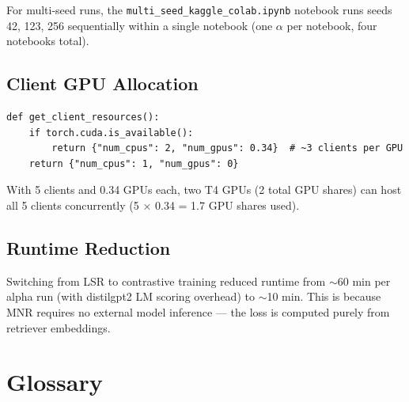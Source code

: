\documentclass[12pt,a4paper]{article}
\begin{document}
For multi-seed runs, the \texttt{multi\_seed\_kaggle\_colab.ipynb} notebook runs seeds 42, 123, 256 sequentially within a single notebook (one $\alpha$ per notebook, four notebooks total).

\subsection{Client GPU Allocation}

\begin{lstlisting}[caption={GPU allocation per Flower client}]
def get_client_resources():
    if torch.cuda.is_available():
        return {"num_cpus": 2, "num_gpus": 0.34}  # ~3 clients per GPU
    return {"num_cpus": 1, "num_gpus": 0}
\end{lstlisting}

With 5 clients and 0.34 GPUs each, two T4 GPUs (2 total GPU shares) can host all 5 clients concurrently (5 $\times$ 0.34 = 1.7 GPU shares used).

\subsection{Runtime Reduction}

Switching from LSR to contrastive training reduced runtime from $\sim$60 min per alpha run (with distilgpt2 LM scoring overhead) to $\sim$10 min. This is because MNR requires no external model inference --- the loss is computed purely from retriever embeddings.

\section{Glossary}
\end{document}
